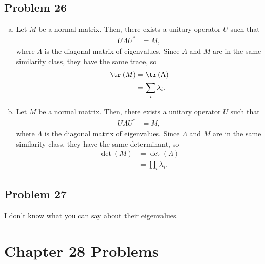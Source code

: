 \documentclass[10pt]{mypackage}
\begin{document}
\subsection{Problem 26}%
\begin{enumerate}[(a)]
  \item Let $M$ be a normal matrix. Then, there exists a unitary operator $U$ such that
    \begin{align*}
      U\Lambda U^{\ast} &= M,
    \end{align*}
    where $\Lambda$ is the diagonal matrix of eigenvalues. Since $\Lambda$ and $M$ are in the same similarity class, they have the same trace, so
    \begin{align*}
      \tr\left(M\right) &= \tr\left(\Lambda\right)\\
                        &= \sum_{i}\lambda_i.
    \end{align*}
  \item Let $M$ be a normal matrix. Then, there exists a unitary operator $U$ such that
    \begin{align*}
      U\Lambda U^{\ast} &= M,
    \end{align*}
    where $\Lambda$ is the diagonal matrix of eigenvalues. Since $\Lambda$ and $M$ are in the same similarity class, they have the same determinant, so
    \begin{align*}
      \det\left(M\right) &= \det\left(\Lambda\right)\\
                         &= \prod_{i}\lambda_i.
    \end{align*}
\end{enumerate}
\subsection{Problem 27}%
I don't know what you can say about their eigenvalues.
\section{Chapter 28 Problems}%
\end{document}
